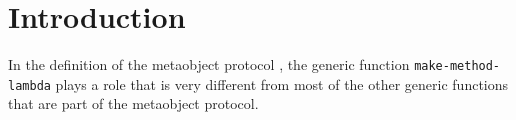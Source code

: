 \section{Introduction}

In the definition of the \commonlisp{} \cite{ansi:common:lisp}
metaobject protocol \cite{Kiczales:1991:AMP:574212}, the generic
function \texttt{make-method-lambda} plays a role that is very
different from most of the other generic functions that are part of
the metaobject protocol.
